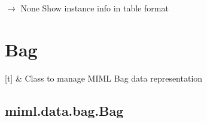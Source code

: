\documentclass[letterpaper,10pt,english]{sphinxmanual}
\begin{document}
\begin{fulllineitems}
\begin{fulllineitems}
\end{fulllineitems}


\begin{fulllineitems}
\label{\detokenize{data/_autosummary/miml.data.instance.Instance:miml.data.instance.Instance.show_instance}}
\pysigstartsignatures
\pysiglinewithargsret
{}
{}
{{ $\rightarrow$ None}}
\pysigstopsignatures
\sphinxAtStartPar
Show instance info in table format

\end{fulllineitems}


\end{fulllineitems}


\sphinxstepscope


\section{Bag}
\label{\detokenize{data/bag:bag}}\label{\detokenize{data/bag::doc}}

\begin{savenotes}\sphinxattablestart
\sphinxthistablewithglobalstyle
\sphinxthistablewithnovlinesstyle
\centering
\begin{tabulary}{\linewidth}[t]{}
\sphinxtoprule
\sphinxtableatstartofbodyhook
\sphinxAtStartPar
{\hyperref[\detokenize{data/_autosummary/miml.data.bag.Bag:miml.data.bag.Bag}]{}}
&
\sphinxAtStartPar
Class to manage MIML Bag data representation
\\
\sphinxbottomrule
\end{tabulary}
\sphinxtableafterendhook\par
\sphinxattableend\end{savenotes}

\sphinxstepscope


\subsection{miml.data.bag.Bag}
\label{\detokenize{data/_autosummary/miml.data.bag.Bag:miml-data-bag-bag}}\label{\detokenize{data/_autosummary/miml.data.bag.Bag::doc}}
\end{document}

